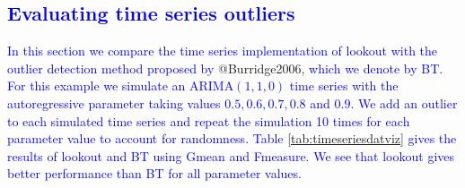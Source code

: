 \documentclass[
]{article}
\begin{document}
\hypertarget{section-1}{%
\subsection*{\texorpdfstring{\textcolor{blue}{Evaluating time series outliers }}{}}\label{section-1}}

\textcolor{blue}{
In this section we compare the time series implementation of lookout with the outlier detection method proposed by }
@Burridge2006,
\textcolor{blue}{which we denote by BT. For this example we simulate an ARIMA$(1, 1, 0)$ time series with the autoregressive parameter taking values $0.5, 0.6, 0.7, 0.8$ and $0.9$. We add an outlier to each simulated time series and repeat the simulation 10 times for each parameter value to account for randomness. Table \ref{tab:timeseriesdatviz} gives the results of lookout and BT using Gmean and Fmeasure. We see that lookout gives better performance than BT for all parameter values. 
}
\end{document}
